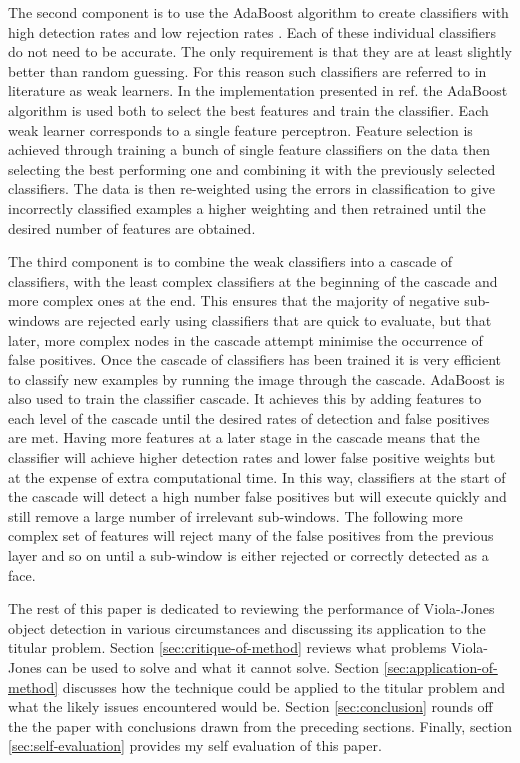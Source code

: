 \documentclass[conference]{IEEEtran}
\begin{document}
The second component is to use the AdaBoost algorithm \cite{freund1996experiments} to create classifiers with high detection rates and low rejection rates \cite{bradski2008learning}. Each of these individual classifiers do not need to be accurate. The only requirement is that they are at least slightly better than random guessing. For this reason such classifiers are referred to in literature as weak learners. In the implementation presented in ref. \cite{viola2004robust} the AdaBoost algorithm is used both to select the best features and train the classifier. Each weak learner corresponds to a single feature perceptron. Feature selection is achieved through training a bunch of single feature classifiers on the data then selecting the best performing one and combining it with the previously selected classifiers. The data is then re-weighted using the errors in classification to give incorrectly classified examples a higher weighting and then retrained until the desired number of features are obtained.

The third component is to combine the weak classifiers into a cascade of classifiers, with the least complex classifiers at the beginning of the cascade and more complex ones at the end. This ensures that the majority of negative sub-windows are rejected early using classifiers that are quick to evaluate, but that later, more complex nodes in the cascade attempt minimise the occurrence of false positives. Once the cascade of classifiers has been trained it is very efficient to classify new examples by running the image through the cascade. AdaBoost is also used to train the classifier cascade. It achieves this by adding features to each level of the cascade until the desired rates of detection and false positives are met. Having more features at a later stage in the cascade means that the classifier will achieve higher detection rates and lower false positive weights but at the expense of extra computational time. In this way, classifiers at the start of the cascade will detect a high number false positives but will execute quickly and still remove a large number of irrelevant sub-windows. The following more complex set of features will reject many of the false positives from the previous layer and so on until a sub-window is either rejected or correctly detected as a face. 

The rest of this paper is dedicated to reviewing the performance of Viola-Jones object detection in various circumstances and discussing its application to the titular problem. Section \ref{sec:critique-of-method} reviews what problems Viola-Jones can be used to solve and what it cannot solve. Section \ref{sec:application-of-method} discusses how the technique could be applied to the titular problem and what the likely issues encountered would be. Section \ref{sec:conclusion} rounds off the the paper with conclusions drawn from the preceding sections. Finally, section \ref{sec:self-evaluation} provides my self evaluation of this paper.
\end{document}
